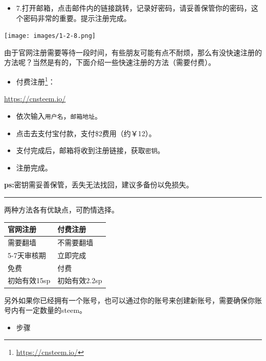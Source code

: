 \documentclass[]{ctexbook}
\providecommand{\tightlist}{%
  \setlength{\itemsep}{0pt}\setlength{\parskip}{0pt}}
\renewcommand{\href}[2]{#2\footnote{\url{#1}}}
\begin{document}
\begin{itemize}
\tightlist
\item
  7.打开邮箱，点击邮件内的链接跳转，记录好密码，请妥善保管你的密码，这个密码非常的重要。提示注册完成。
\end{itemize}

\texttt{[image: images/1-2-8.png]}

由于官网注册需要等待一段时间，有些朋友可能有点不耐烦，那么有没快速注册的方法呢？当然是有的，下面介绍一些快速注册的方法（需要付费）。

\begin{itemize}
\tightlist
\item
  \href{https://cnsteem.io/}{付费注册}：
\end{itemize}

\url{https://cnsteem.io/}

\begin{itemize}
\tightlist
\item
  依次输入\texttt{用户名}，\texttt{邮箱地址}。
\item
  点击去支付宝付款，支付\$2费用（约￥12）。
\item
  支付完成后，邮箱将收到注册链接，获取\texttt{密钥}。
\item
  注册完成。
\end{itemize}

\textbf{ps:}密钥需妥善保管，丢失无法找回，建议多备份以免损失。

\begin{center}\rule{0.5\linewidth}{\linethickness}\end{center}

两种方法各有优缺点，可酌情选择。

\begin{longtable}[]{@{}ll@{}}
\toprule
官网注册 & 付费注册\tabularnewline
\midrule
\endhead
需要翻墙 & 不需要翻墙\tabularnewline
5-7天审核期 & 立即完成\tabularnewline
免费 & 付费\tabularnewline
初始有效15sp & 初始有效2.2sp\tabularnewline
\bottomrule
\end{longtable}

另外如果你已经拥有一个账号，也可以通过你的账号来创建新账号，需要确保你账号内有一定数量的steem。

\begin{itemize}
\tightlist
\item
  步骤
\end{itemize}
\end{document}
